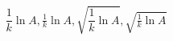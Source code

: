 \documentclass{book}
\begin{document}
\begin{equation*}
\frac{1}{k}\ln A, \tfrac{1}{k}\ln A, \sqrt{
\frac{1}{k}\ln A}, \sqrt{\tfrac{1}{k}\ln A}
\end{equation*}
\end{document}
